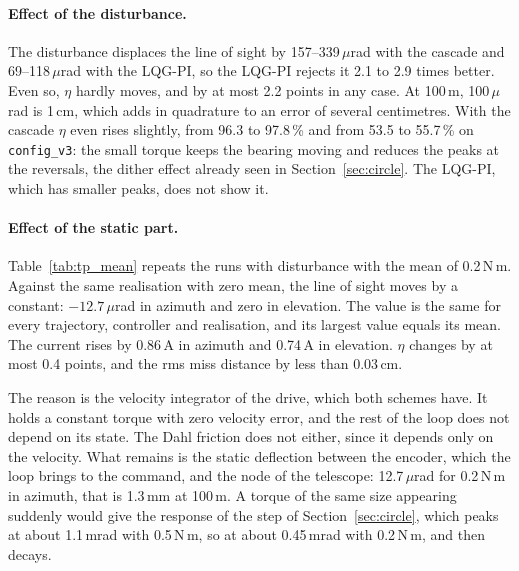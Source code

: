 \paragraph{Effect of the disturbance.} The disturbance displaces the line of sight by 157--339\,$\mu$rad with the cascade and 69--118\,$\mu$rad with the LQG-PI, so the LQG-PI rejects it 2.1 to 2.9 times better. Even so, $\eta$ hardly moves, and by at most 2.2 points in any case. At 100\,m, 100\,$\mu$rad is 1\,cm, which adds in quadrature to an error of several centimetres. With the cascade $\eta$ even rises slightly, from 96.3 to 97.8\,\% and from 53.5 to 55.7\,\% on \texttt{config\_v3}: the small torque keeps the bearing moving and reduces the peaks at the reversals, the dither effect already seen in Section~\ref{sec:circle}. The LQG-PI, which has smaller peaks, does not show it.

\paragraph{Effect of the static part.} Table~\ref{tab:tp_mean} repeats the runs with disturbance with the mean of 0.2\,N\,m. Against the same realisation with zero mean, the line of sight moves by a constant: $-12.7\,\mu$rad in azimuth and zero in elevation. The value is the same for every trajectory, controller and realisation, and its largest value equals its mean. The current rises by 0.86\,A in azimuth and 0.74\,A in elevation. $\eta$ changes by at most 0.4 points, and the rms miss distance by less than 0.03\,cm.

The reason is the velocity integrator of the drive, which both schemes have. It holds a constant torque with zero velocity error, and the rest of the loop does not depend on its state. The Dahl friction does not either, since it depends only on the velocity. What remains is the static deflection between the encoder, which the loop brings to the command, and the node of the telescope: 12.7\,$\mu$rad for 0.2\,N\,m in azimuth, that is 1.3\,mm at 100\,m. A torque of the same size appearing suddenly would give the response of the step of Section~\ref{sec:circle}, which peaks at about 1.1\,mrad with 0.5\,N\,m, so at about 0.45\,mrad with 0.2\,N\,m, and then decays.

